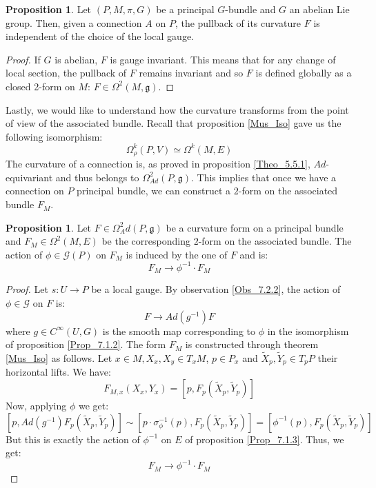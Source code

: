 \documentclass[12pt,a4paper]{report}
\theoremstyle{definition}
\theoremstyle{Theorem}
\newtheorem{Prop}[Def]{Proposition}
\theoremstyle{definition}
\theoremstyle{definition}
\begin{document}
	\begin{Prop}\label{Prop_7.2.2}
		Let $(P,M,\pi,G)$ be a principal $G$-bundle and $G$ an abelian Lie group. Then, given a connection $A$ on $P$, the pullback of its curvature $F$ is independent of the choice of the local gauge.
	\end{Prop}
	\begin{proof}
		If $G$ is abelian, $F$ is gauge invariant. This means that for any change of local section, the pullback of $F$ remains invariant and so $F$ is defined globally as a closed 2-form on $M$: $F\in \Omega^2(M,\mathfrak{g})$.
	\end{proof}
	Lastly, we would like to understand how the curvature transforms from the point of view of the associated bundle. Recall that proposition \ref{Mus_Iso} gave us the following isomorphism:
	$$\Omega^k_\rho(P,V)\simeq \Omega^k(M,E)$$
	The curvature of a connection is, as proved in proposition \ref{Theo_5.5.1}, $Ad$-equivariant and thus belongs to $\Omega^2_{Ad}(P,\mathfrak{g})$. This implies that once we have a connection on $P$ principal bundle, we can construct a $2$-form on the associated bundle $F_M$.
	\begin{Prop}\label{Prop_7.2.3}
		Let $F\in \Omega^2_Ad(P,\mathfrak{g})$ be a curvature form on a principal bundle and $F_M\in\Omega^2(M,E)$ be the corresponding $2$-form on the associated bundle. The action of $\phi\in\mathcal{G}(P)$ on $F_M$ is induced by the one of $F$ and is:
		$$F_M\rightarrow \phi^{-1}\cdot F_M$$
	\end{Prop}
	\begin{proof}
		Let $s:U\rightarrow P$ be a local gauge. By observation \ref{Obs_7.2.2}, the action of $\phi\in\mathcal{G}$ on $F$ is:
		$$F\rightarrow Ad(g^{-1})F$$
		where $g\in C^\infty(U,G)$ is the smooth map corresponding to $\phi$ in the isomorphism of proposition \ref{Prop_7.1.2}. The form $F_M$ is constructed through theorem \ref{Mus_Iso} as follows. Let $x\in M,X_x,X_y\in T_xM$, $p\in P_x$ and $\tilde{X}_p,\tilde{Y}_p\in T_pP$ their horizontal lifts. We have:
		$$F_{M,x}(X_x,Y_x)=[p,F_p(\tilde{X}_p,\tilde{Y}_p)]$$
		Now, applying $\phi$ we get:
		$$[p,Ad(g^{-1})F_p(\tilde{X}_p,\tilde{Y}_p)]\sim [p\cdot \sigma^{-1}_\phi(p),F_p(\tilde{X}_p,\tilde{Y}_p)]=[\phi^{-1}(p),F_p(\tilde{X}_p,\tilde{Y}_p)]$$
		But this is exactly the action of $\phi^{-1}$ on $E$ of proposition \ref{Prop_7.1.3}. Thus, we get:
		$$F_M\rightarrow \phi^{-1}\cdot F_M$$
	\end{proof}
\end{document}
